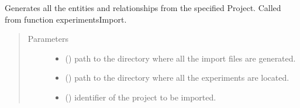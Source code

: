 \documentclass[letterpaper,10pt,english]{sphinxmanual}
\begin{document}
\begin{fulllineitems}
\label{\detokenize{_autosummary/graphdb_builder.builder:graphdb_builder.builder.importer.experimentImport}}
Generates all the entities and relationships from the specified Project. Called from function experimentsImport.
\begin{quote}\begin{description}
\item[{Parameters}] \leavevmode\begin{itemize}
\item {} 
 () \textendash{} path to the directory where all the import files are generated.

\item {} 
 () \textendash{} path to the directory where all the experiments are located.

\item {} 
 () \textendash{} identifier of the project to be imported.

\end{itemize}

\end{description}\end{quote}

\end{fulllineitems}

\end{document}
